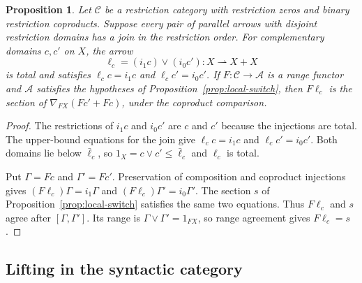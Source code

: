 \documentclass[11pt]{article}
\newtheorem{proposition}[theorem]{Proposition}
\begin{document}
\begin{proposition}\label{prop:disjoint-joins}
Let $\mathcal C$ be a restriction category with restriction zeros and
binary restriction coproducts. Suppose every pair of parallel arrows
with disjoint restriction domains has a join in the restriction order.
For complementary domains $c,c'$ on $X$, the arrow
\[
 \ell_c=(i_1c)\vee(i_0c'):X\rightharpoonup X+X
\]
is total and satisfies $\ell_cc=i_1c$ and $\ell_cc'=i_0c'$.
If $F:\mathcal C\to\mathcal A$ is a range functor and $\mathcal A$
satisfies the hypotheses of Proposition~\ref{prop:local-switch},
then $F\ell_c$ is the section of
$\nabla_{FX}(Fc'+Fc)$, under the coproduct comparison.
\end{proposition}
\begin{proof}
The restrictions of $i_1c$ and $i_0c'$ are $c$ and $c'$ because
the injections are total. The upper-bound equations for the join
give $\ell_cc=i_1c$ and $\ell_cc'=i_0c'$.
Both domains lie below $\bar\ell_c$, so
$1_X=c\vee c'\le\bar\ell_c$ and $\ell_c$ is total.

Put $\Gamma=Fc$ and $\Gamma'=Fc'$. Preservation of composition
and coproduct injections gives
$(F\ell_c)\Gamma=i_1\Gamma$ and
$(F\ell_c)\Gamma'=i_0\Gamma'$.
The section $s$ of Proposition~\ref{prop:local-switch} satisfies the
same two equations. Thus $F\ell_c$ and $s$ agree after
$[\Gamma,\Gamma']$. Its range is
$\Gamma\vee\Gamma'=1_{FX}$, so range agreement gives $F\ell_c=s$.
\end{proof}

\subsection{Lifting in the syntactic category}
\end{document}
